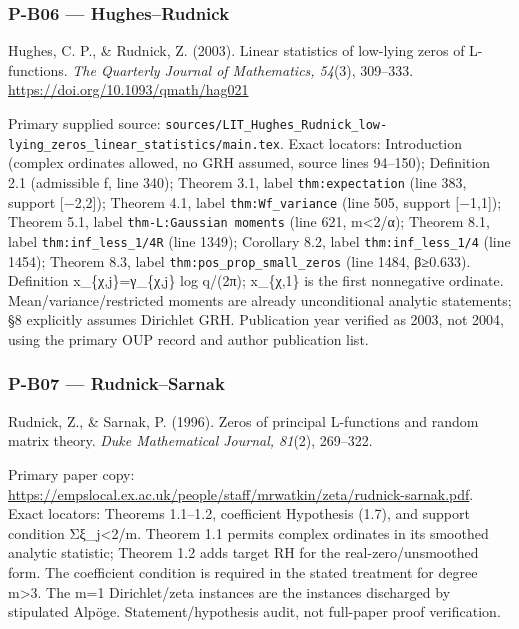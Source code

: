 \documentclass[11pt,a4paper]{article}
\theoremstyle{definition}\newtheorem{definition}{Definition}
\begin{document}
\subsubsection{P-B06 --- Hughes--Rudnick}\label{p-b06--hughesrudnick}

Hughes, C. P., \& Rudnick, Z. (2003). Linear statistics of low-lying
zeros of L-functions. \emph{The Quarterly Journal of Mathematics,
54}(3), 309--333. \url{https://doi.org/10.1093/qmath/hag021}

Primary supplied source:
\nolinkurl{sources/LIT_Hughes_Rudnick_low-lying_zeros_linear_statistics/main.tex}.
Exact locators: Introduction (complex ordinates allowed, no GRH assumed,
source lines 94--150); Definition 2.1 (admissible f, line 340); Theorem
3.1, label \nolinkurl{thm:expectation} (line 383, support {[}−2,2{]});
Theorem 4.1, label \nolinkurl{thm:Wf_variance} (line 505, support
{[}−1,1{]}); Theorem 5.1, label \texttt{thm-L:Gaussian\ moments} (line
621, m\textless2/α); Theorem 8.1, label \nolinkurl{thm:inf_less_1/4R}
(line 1349); Corollary 8.2, label \nolinkurl{thm:inf_less_1/4} (line
1454); Theorem 8.3, label \nolinkurl{thm:pos_prop_small_zeros} (line
1484, β≥0.633). Definition x\_\{χ,j\}=γ\_\{χ,j\} log q/(2π); x\_\{χ,1\}
is the first nonnegative ordinate. Mean/variance/restricted moments are
already unconditional analytic statements; §8 explicitly assumes
Dirichlet GRH. Publication year verified as 2003, not 2004, using the
primary OUP record and author publication list.

\subsubsection{P-B07 --- Rudnick--Sarnak}\label{p-b07--rudnicksarnak}

Rudnick, Z., \& Sarnak, P. (1996). Zeros of principal L-functions and
random matrix theory. \emph{Duke Mathematical Journal, 81}(2), 269--322.

Primary paper copy:
\url{https://empslocal.ex.ac.uk/people/staff/mrwatkin/zeta/rudnick-sarnak.pdf}.
Exact locators: Theorems 1.1--1.2, coefficient Hypothesis (1.7), and
support condition Σ\textbar ξ\_j\textbar\textless2/m. Theorem 1.1
permits complex ordinates in its smoothed analytic statistic; Theorem
1.2 adds target RH for the real-zero/unsmoothed form. The coefficient
condition is required in the stated treatment for degree m\textgreater3.
The m=1 Dirichlet/zeta instances are the instances discharged by
stipulated Alpöge. Statement/hypothesis audit, not full-paper proof
verification.
\end{document}
